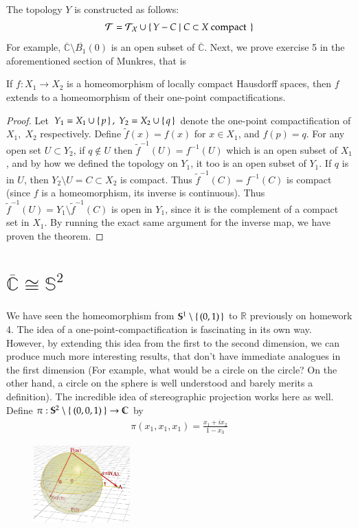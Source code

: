 \documentclass[12pt]{article}
\newenvironment{theorem}{\begin{mytheorem}}{\end{mytheorem}}
\theoremstyle{definitionstyle}
\def\mbb#1{\mathbb{#1}}
\def \C{\mbb{C}}
\def \R{\mbb{R}}
\renewcommand{\S}{\mbb S}
\begin{document}
	The topology $Y$ is constructed as follows:
	\begin{align*}
		\mathcal{T} = \mathcal{T_X} \cup \set{Y - C | C \subset X \text{ compact }}
	\end{align*}
	For example, $\overline{\C} \setminus \overline{B_1}(0)$ is an open subset of $\overline{\C}$. Next, we prove exercise 5 in the aforementioned section of Munkres, that is
	\begin{theorem}
		If $f: X_1 \to X_2$ is a homeomorphism of locally compact Hausdorff spaces, then $f$ extends to a homeomorphism of their one-point compactifications.
	\end{theorem}
	\begin{proof}
		Let $Y_1 = X_1 \cup \set{p},\; Y_2 = X_2 \cup \set{q}$ denote the one-point compactification of $X_1,\; X_2$ respectively. Define $\tilde{f}(x) = f(x)$ for $x \in X_1$, and $f(p) = q$. For any open set $U \subset Y_2$, if $q \not \in U$ then $\tilde{f}^{-1}(U) = f^{-1}(U)$ which is an open subset of $X_1$, and by how we defined the topology on $Y_1$, it too is an open subset of $Y_1$. If $q$ is in $U$, then $Y_2 \setminus U = C \subset X_2$ is compact. Thus $\tilde{f}^{-1}(C) = f^{-1}(C)$ is compact (since $f$ is a homeomorphism, its inverse is continuous). Thus $\tilde f^{-1}(U) = Y_1 \setminus \tilde f^{-1}(C)$ is open in $Y_1$, since it is the complement of a compact set in $X_1$. By running the exact same argument for the inverse map, we have proven the theorem.
	\end{proof}

	\section{$\overline{\C} \cong \S^2$}
	We have seen the homeomorphism from $\S^1 \setminus \set{(0, 1)}$ to $\R$ previously on homework 4. The idea of a one-point-compactification is fascinating in its own way. However, by extending this idea from the first to the second dimension, we can produce much more interesting results, that don't have immediate analogues in the first dimension (For example, what would be a circle on the circle? On the other hand, a circle on the sphere is well understood and barely merits a definition). The incredible idea of stereographic projection works here as well. Define $\pi: \S^2 \setminus \Set{(0,0,1)} \to \C$ by 
	\begin{align*}
		\pi(x_1, x_1, x_1) = \frac{x_1+ix_2}{1-x_3}
	\end{align*}
	\begin{figure} %
		\includegraphics[width=0.33\textwidth]{projection}
	\end{figure}
\end{document}

